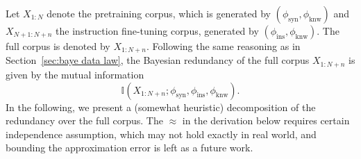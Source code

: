 \documentclass[11pt]{article}
\theoremstyle{plain}
\theoremstyle{definition}
\newcommand{\knwModel}{\phi_{\text{knw}}}
\newcommand{\synModel}{\phi_{\text{syn}}}
\newcommand{\instructionModel}{\phi_{\text{ins}}}
\begin{document}
Let \( X_{1:N} \) denote the pretraining corpus, which is generated by
$(\synModel,\knwModel)$ and \( X_{N+1:N+n} \) the instruction fine-tuning corpus, generated by $(\instructionModel,\knwModel)$. 
The full corpus is denoted by \( X_{1:N+n} \).
Following the same reasoning as in Section~\ref{sec:baye data law}, 
the Bayesian redundancy of the full corpus \( X_{1:N+n} \) 
is given by the mutual information  
$$
\mathbb{I}(X_{1:N+n}; \synModel, \instructionModel, \knwModel). 
$$ 
In the following, we present a (somewhat heuristic) decomposition of the redundancy 
over the full corpus. 
The $\approx$ in the derivation below requires certain independence 
assumption, which may not hold exactly in real world,
and bounding the approximation error is left as a future work.
\end{document}
